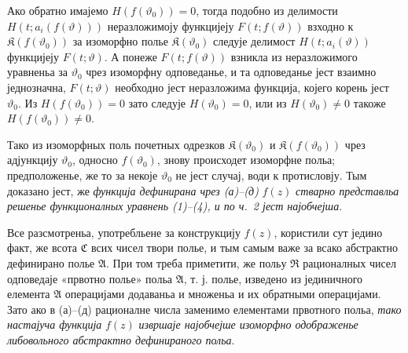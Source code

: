 ﻿\documentclass[11pt]{article}
\providecommand{\Afield}{\mathfrak A}
\providecommand{\Cfield}{\mathfrak C}
\providecommand{\Kfield}{\mathfrak K}
\providecommand{\Rfield}{\mathfrak R}
\begin{document}
Ако обратно имајемо \(H(f(\vartheta_0))=0\), тогда подобно из делимости \(H(t;a_i(f(\vartheta)))\) неразложимоју функцијеју \(F(t;f(\vartheta))\) взходно к \(\Kfield(f(\vartheta_0))\) за изоморфно полье \(\Kfield(\vartheta_0)\) следује делимост \(H(t;a_i(\vartheta))\) функцијеју \(F(t;\vartheta)\). А понеже \(F(t;f(\vartheta))\) взникла из неразложимого уравненьа за \(\vartheta_0\) чрез изоморфну одповеданье, и та одповеданье јест взаимно једнозначна, \(F(t;\vartheta)\) необходно јест неразложима функција, којего корень јест \(\vartheta_0\). Из \(H(f(\vartheta_0))=0\) зато следује \(H(\vartheta_0)=0\), или из \(H(\vartheta_0)\ne0\) такоже \(H(f(\vartheta_0))\ne0\).

Тако из изоморфных поль почетных одрезков \(\Kfield(\vartheta_0)\) и \(\Kfield(f(\vartheta_0))\) чрез адјункцију \(\vartheta_0\), односно \(f(\vartheta_0)\), знову происходет изоморфне польа; предположенье, же то за некоје \(\vartheta_0\) не јест случај, води к протисловју. Тым доказано јест, же {\itshape функција дефинирана чрез (а)--(д)} \(f(z)\) {\itshape стварно представльа решенье функционалных уравнень (1)--(4), и по ч.~2 јест најобчејша}.

Все разсмотреньа, употребльене за конструкцију \(f(z)\), користили сут једино факт, же всота \(\Cfield\) всих чисел твори полье, и тым самым важе за всако абстрактно дефинирано полье \(\Afield\). При том треба приметити, же польу \(\Rfield\) рационалных чисел одповедаје «првотно полье» польа \(\Afield\), т. ј. полье, изведено из јединичного елемента \(\Afield\) операцијами додаваньа и множеньа и их обратными операцијами. Зато ако в (а)--(д) рационалне числа заменимо елементами првотного польа, {\itshape тако настајуча функција} \(f(z)\) {\itshape извршаје најобчејше изоморфно одображенье либовольного абстрактно дефинираного польа}.
\end{document}
